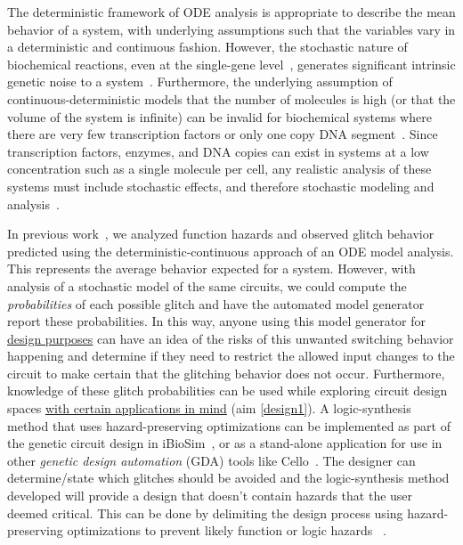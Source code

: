 \documentclass[12pt]{article}
\begin{document}
The deterministic framework of ODE analysis is appropriate to describe the mean behavior of a system, with underlying assumptions such that the variables vary in a deterministic and continuous fashion. However, the stochastic nature of biochemical reactions, even at the single-gene level~\cite{elowitz_StochasticGeneExpression_2002}, generates significant intrinsic genetic noise to a system~\cite{purnick_SecondWaveSynthetic_2009}. Furthermore, the underlying assumption of continuous-deterministic models that the number of molecules is high (or that the volume of the system is infinite) can be invalid for biochemical systems where there are very few transcription factors or only one copy DNA segment~\cite{kaznessis_ModelsSyntheticBiology_2007}. Since transcription factors, enzymes, and DNA copies can exist in systems at a low concentration such as a single molecule per cell, any realistic analysis of these systems must include stochastic effects, and therefore stochastic modeling and analysis~\cite{crook_ModelbasedDesignSynthetic_2013}.

In previous work~\cite{fontanarrosa_AnalyzingGeneticCircuits_2019}, we analyzed function hazards and observed glitch behavior predicted using the deterministic-continuous approach of an ODE model analysis. This represents the average behavior expected for a system. However, with analysis of a stochastic model of the same circuits, we could compute the \emph{probabilities} of each possible glitch and have the automated model generator report these probabilities. In this way, anyone using this model generator for \hyperlink{design}{design purposes} can have an idea of the risks of this unwanted switching behavior happening and determine if they need to restrict the allowed input changes to the circuit to make certain that the glitching behavior does not occur. Furthermore, knowledge of these glitch probabilities can be used while exploring circuit design spaces \hyperlink{design}{with certain applications in mind} (aim \ref{design1}). A \hypertarget{hazardDesign}{logic-synthesis method} that uses hazard-preserving optimizations can be implemented as part of the genetic circuit design in iBioSim~\cite{watanabe_IBioSimToolModelbased_2018}, or as a stand-alone application for use in other \emph{genetic design automation} (GDA) tools like Cello~\cite{nielsen_GeneticCircuitDesign_2016}. The designer can determine/state which glitches should be avoided and the logic-synthesis method developed will provide a design that doesn't contain hazards that the user deemed critical. This can be done by delimiting the design process using hazard-preserving optimizations to prevent likely function or logic hazards~\cite{myers_AsynchronousCircuitDesign_2001} . 
\end{document}
